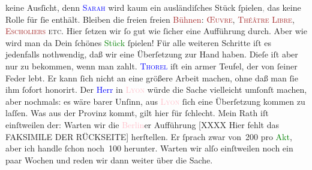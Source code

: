                keine Ausſicht, denn \textsc{\textcolor{blue}{Sarah}{}\ledrightnote{\textcolor{blue}{Sarah Bernhardt}}} wird kaum ein {\pb}ausländiſches Stück
                  ſpielen\textcolor{gray}{,} das keine Rolle für ſie enthält. Bleiben die freien
               freien \textcolor{brown}{Bühnen}{}: \textsc{\textcolor{brown}{Œuvre}{}\ledrightnote{\textcolor{brown}{Théâtre de l’Œuvre}}, \textcolor{brown}{Théâtre
                     Libre}{}\ledrightnote{\textcolor{brown}{Théâtre Libre}}, \textcolor{brown}{Escholiers}{}\ledrightnote{\textcolor{brown}{Théâtre des Escholiers}} etc}.  Hier ſetzen wir ſo gut wie ſicher eine Aufführung
               durch. Aber wie wird man da Dein ſchönes \textcolor{green}{Stück}{} ſpielen!\pend
           \pstart
           Für alle weiteren Schritte iſt es \strikeout{\textcolor{gray}{×}} jedenfalls nothwendig, daß wir eine Überſetzung zur Hand haben. Dieſe iſt aber
               nur zu bekommen, wenn man zahlt. \textsc{\textcolor{blue}{Thorel}{}\ledrightnote{\textcolor{blue}{Jean Thorel}}} iſt ein armer  Teufel, {\pb}der von ſeiner Feder lebt. Er kann
               ſich nicht an eine größere Arbeit machen, ohne daß man ſie ihm ſofort honorirt. \strikeout{\textcolor{gray}{Wenn}} Der \textcolor{blue}{Herr}{} in \textsc{\textcolor{pink}{Lyon}{}\ledrightnote{\textcolor{pink}{Lyon}}} würde die Sache vielleicht umſonſt machen, aber nochmals: es wäre barer Unſinn,
               aus \textsc{\textcolor{pink}{Lyon}{}\ledrightnote{\textcolor{pink}{Lyon}}} ſich eine Überſetzung kommen zu laſſen.  Was
               aus der Provinz kommt, gilt hier für ſchlecht. Mein Rath iſt einſtweilen der: Warten
               wir die \textcolor{pink}{Berlin}{}\ledrightnote{\textcolor{pink}{Berlin}}er Aufführung \pend
           \pstart
           {[}XXXX Hier fehlt das FAKSIMILE DER RÜCKSEITE{]}\pend
           \pstart
           {\pb}herſtellen. Er ſprach zwar von 200 pro \textcolor{green}{Akt}{}, aber ich handle ſchon
               noch 100 herunter. Warten wir alſo einſtweilen noch ein paar Wochen\strikeout{\textcolor{gray}{n}} und reden wir dann weiter über die Sache.\pend
